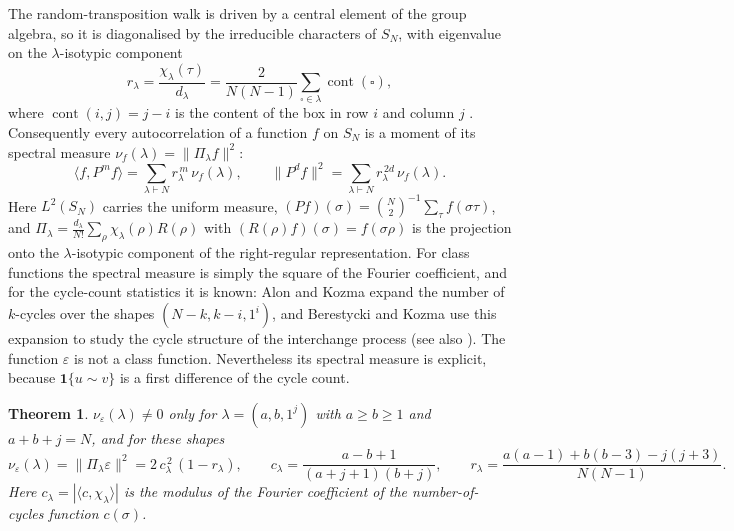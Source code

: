 \documentclass[11pt]{amsart}
\newtheorem{theorem}{Theorem}[section]
\theoremstyle{remark}
\newcommand{\SN}{S_N}
\newcommand{\cont}{\operatorname{cont}}
\begin{document}
The random-transposition walk is driven by a central element of the group algebra, so it is diagonalised by the irreducible characters of $\SN$, with eigenvalue on the $\lambda$-isotypic component
\begin{equation}\label{eq:r}
r_\lambda=\frac{\chi_\lambda(\tau)}{d_\lambda}=\frac{2}{N(N-1)}\sum_{\square\in\lambda}\cont(\square),
\end{equation}
where $\cont(i,j)=j-i$ is the content of the box in row $i$ and column $j$ \cite{DS81}.  Consequently every autocorrelation of a function $f$ on $\SN$ is a moment of its spectral measure $\nu_f(\lambda)=\|\Pi_\lambda f\|^2$:
\[
\langle f,P^mf\rangle=\sum_{\lambda\vdash N}r_\lambda^{\,m}\,\nu_f(\lambda),
\qquad
\|P^df\|^2=\sum_{\lambda\vdash N}r_\lambda^{\,2d}\,\nu_f(\lambda).
\]
Here $L^2(\SN)$ carries the uniform measure, $(Pf)(\sigma)=\binom N2^{-1}\sum_\tau f(\sigma\tau)$, and $\Pi_\lambda=\frac{d_\lambda}{N!}\sum_\rho\chi_\lambda(\rho)R(\rho)$ with $(R(\rho)f)(\sigma)=f(\sigma\rho)$ is the projection onto the $\lambda$-isotypic component of the right-regular representation.  For class functions the spectral measure is simply the square of the Fourier coefficient, and for the cycle-count statistics it is known: Alon and Kozma \cite[Thm.~3]{AK13} expand the number of $k$-cycles over the shapes $(N-k,k-i,1^i)$, and Berestycki and Kozma \cite{BK15} use this expansion to study the cycle structure of the interchange process (see also \cite{Arc25}).  The function $\varepsilon$ is not a class function.  Nevertheless its spectral measure is explicit, because $\mathbf 1\{u\sim v\}$ is a first difference of the cycle count.

\begin{theorem}\label{thm:main}
$\nu_\varepsilon(\lambda)\ne0$ only for $\lambda=(a,b,1^j)$ with $a\ge b\ge1$ and $a+b+j=N$, and for these shapes
\begin{equation}\label{eq:main}
\nu_\varepsilon(\lambda)=\|\Pi_\lambda\varepsilon\|^2=2\,c_\lambda^{\,2}\,(1-r_\lambda),
\qquad
c_\lambda=\frac{a-b+1}{(a+j+1)(b+j)},
\qquad
r_\lambda=\frac{a(a-1)+b(b-3)-j(j+3)}{N(N-1)} .
\end{equation}
Here $c_\lambda=|\langle c,\chi_\lambda\rangle|$ is the modulus of the Fourier coefficient of the number-of-cycles function $c(\sigma)$.
\end{theorem}
\end{document}
